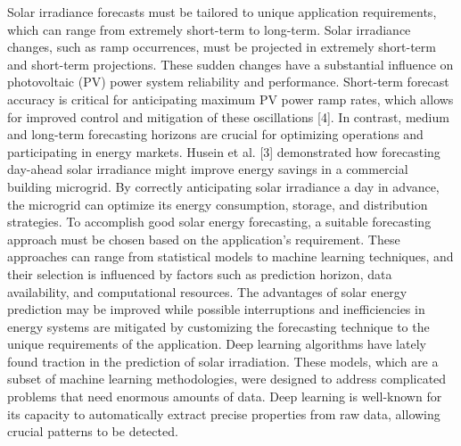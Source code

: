 \documentclass[a4paper,fleqn]{cas-sc}
\begin{document}
Solar irradiance forecasts must be tailored to unique application requirements, which can range from extremely short-term to long-term. Solar irradiance changes, such as ramp occurrences, must be projected in extremely short-term and short-term projections. These sudden changes have a substantial influence on photovoltaic (PV) power system reliability and performance. Short-term forecast accuracy is critical for anticipating maximum PV power ramp rates, which allows for improved control and mitigation of these oscillations [4]. In contrast, medium and long-term forecasting horizons are crucial for optimizing operations and participating in energy markets. Husein et al. [3] demonstrated how forecasting day-ahead solar irradiance might improve energy savings in a commercial building microgrid. By correctly anticipating solar irradiance a day in advance, the microgrid can optimize its energy consumption, storage, and distribution strategies. To accomplish good solar energy forecasting, a suitable forecasting approach must be chosen based on the application's requirement. These approaches can range from statistical models to machine learning techniques, and their selection is influenced by factors such as prediction horizon, data availability, and computational resources. The advantages of solar energy prediction may be improved while possible interruptions and inefficiencies in energy systems are mitigated by customizing the forecasting technique to the unique requirements of the application.
Deep learning algorithms have lately found traction in the prediction of solar irradiation. These models, which are a subset of machine learning methodologies, were designed to address complicated problems that need enormous amounts of data. Deep learning is well-known for its capacity to automatically extract precise properties from raw data, allowing crucial patterns to be detected.
\end{document}
